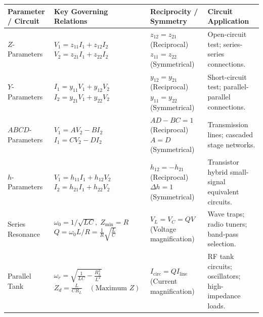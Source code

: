 \documentclass[12pt,a4paper]{article}
\renewcommand{\arraystretch}{1.45}
\begin{document}
\begin{tcolorbox}[tikzbox, top=3pt, bottom=3pt, title={\textbf{Summary Matrix: Comprehensive Comparison of Two-Port Parameters and Resonant Circuits}}]
\par\vspace{1pt}\noindent
\begingroup
\setlength{\tabcolsep}{3.5pt}
\setlength{\extrarowheight}{1.0pt}
\renewcommand{\arraystretch}{1.12}
\begin{tabularx}{\linewidth}{|B{2.6cm}|B{4.0cm}|B{3.2cm}|Y|}
\hline
\textbf{Parameter / Circuit} & \textbf{Key Governing Relations} & \textbf{Reciprocity / Symmetry} & \textbf{Circuit Application} \\
\hline
$Z$-Parameters & $V_1 = z_{11} I_1 + z_{12} I_2$\newline $V_2 = z_{21} I_1 + z_{22} I_2$ & $z_{12} = z_{21}$ (Reciprocal)\newline $z_{11} = z_{22}$ (Symmetrical) & Open-circuit test; series-series connections. \\
\hline
$Y$-Parameters & $I_1 = y_{11} V_1 + y_{12} V_2$\newline $I_2 = y_{21} V_1 + y_{22} V_2$ & $y_{12} = y_{21}$ (Reciprocal)\newline $y_{11} = y_{22}$ (Symmetrical) & Short-circuit test; parallel-parallel connections. \\
\hline
$ABCD$-Parameters & $V_1 = A V_2 - B I_2$\newline $I_1 = C V_2 - D I_2$ & $AD - BC = 1$ (Reciprocal)\newline $A = D$ (Symmetrical) & Transmission lines; cascaded stage networks. \\
\hline
$h$-Parameters & $V_1 = h_{11} I_1 + h_{12} V_2$\newline $I_2 = h_{21} I_1 + h_{22} V_2$ & $h_{12} = -h_{21}$ (Reciprocal)\newline $\Delta h = 1$ (Symmetrical) & Transistor hybrid small-signal equivalent circuits. \\
\hline
Series Resonance & $\omega_0 = 1/\sqrt{LC}, \; Z_{\min} = R$\newline $Q = \omega_0 L / R = \frac{1}{R}\sqrt{\frac{L}{C}}$ & $V_L = V_C = Q V$\newline (Voltage magnification) & Wave traps; radio tuners; band-pass selection. \\
\hline
Parallel Tank & $\omega_r = \sqrt{\frac{1}{LC} - \frac{R_L^2}{L^2}}$\newline $Z_d = \frac{L}{C R_L} \quad (\text{Maximum } Z)$ & $I_{\text{circ}} = Q I_{\text{line}}$\newline (Current magnification) & RF tank circuits; oscillators; high-impedance loads. \\
\hline
\end{tabularx}
\endgroup
\end{tcolorbox}
\end{document}
